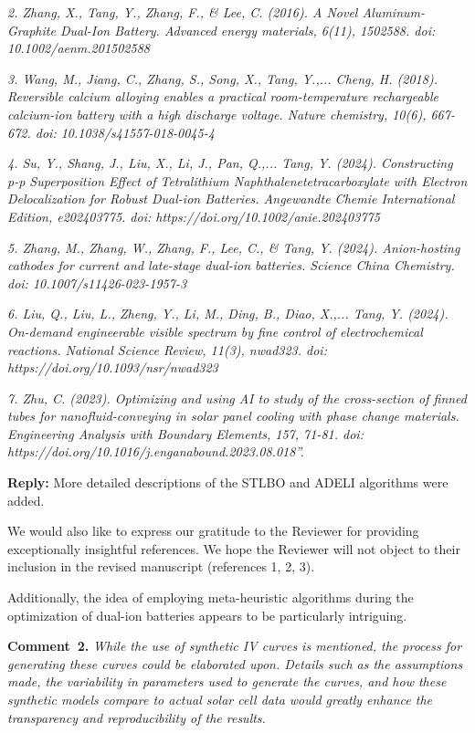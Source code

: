 \documentclass[a4paper,fleqn]{cas-sc}
\begin{document}
\emph{
2. Zhang, X., Tang, Y., Zhang, F., \& Lee, C. (2016).
A Novel Aluminum-Graphite Dual-Ion Battery. Advanced energy materials, 6(11), 1502588.
doi: 10.1002/aenm.201502588
}

\emph{
3. Wang, M., Jiang, C., Zhang, S., Song, X., Tang, Y.,... Cheng, H. (2018).
Reversible calcium alloying enables a practical room-temperature rechargeable
calcium-ion battery with a high discharge voltage. Nature chemistry, 10(6), 667-672.
doi: 10.1038/s41557-018-0045-4
}

\emph{
4. Su, Y., Shang, J., Liu, X., Li, J., Pan, Q.,... Tang, Y. (2024).
Constructing p-p Superposition Effect of Tetralithium Naphthalenetetracarboxylate
with Electron Delocalization for Robust Dual-ion Batteries.
Angewandte Chemie International Edition, e202403775.
doi: https://doi.org/10.1002/anie.202403775
}

\emph{
5. Zhang, M., Zhang, W., Zhang, F., Lee, C., \& Tang, Y. (2024).
Anion-hosting cathodes for current and late-stage dual-ion batteries.
Science China Chemistry.
doi: 10.1007/s11426-023-1957-3
}

\emph{
6. Liu, Q., Liu, L., Zheng, Y., Li, M., Ding, B., Diao, X.,... Tang, Y. (2024).
On-demand engineerable visible spectrum by fine control of electrochemical reactions.
National Science Review, 11(3), nwad323.
doi: https://doi.org/10.1093/nsr/nwad323
}

\emph{
7. Zhu, C. (2023).
Optimizing and using AI to study of the cross-section of finned
tubes for nanofluid-conveying in solar panel cooling with phase change materials.
Engineering Analysis with Boundary Elements, 157, 71-81.
doi: https://doi.org/10.1016/j.enganabound.2023.08.018''.
}

\noindent
\textcolor[rgb]{0.51,0.00,0.00}{\textbf{Reply:}}
More detailed descriptions of the STLBO and ADELI algorithms were added.

We would also like to express our gratitude to the Reviewer for providing exceptionally insightful references.
We hope the Reviewer will not object to their inclusion in the revised manuscript (references 1, 2, 3).

Additionally, the idea of employing meta-heuristic algorithms during the optimization of dual-ion batteries appears to be particularly intriguing.







\vspace{1cm}
\noindent
\textcolor[rgb]{0.00,0.50,1.00}{\textbf{Comment~2.}}
\emph{While the use of synthetic IV curves is mentioned, the process for generating
these curves could be elaborated upon.
Details such as the assumptions made, the variability in parameters used to generate the curves,
and how these synthetic models compare to actual solar cell data would greatly enhance the transparency and reproducibility of the results.}
\end{document}

